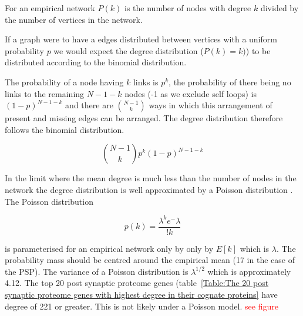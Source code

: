 For an empirical network $P(k)$ is the number of nodes with degree $k$ divided by the number of vertices in the network. 



If a graph were to have a  edges distributed between vertices with a uniform probability $p$ we would expect the degree distribution ($P(k)=k)$) to be distributed according to the binomial distribution.  

 The probability of a node having $k$ links is $p^k$, the probability of there being no links to the remaining $N-1-k$ nodes (-1 as we exclude self loops) is $(1-p)^{N-1-k}$ and there are $\binom{N-1}{k}$ ways in which this arrangement of present and missing edges can be arranged. The degree distribution therefore follows the binomial distribution.\cite{barabasi2016network}

\begin{equation}
   \binom{N-1}{k}        p^k (1-p)^{N-1-k}
   \label{Equation:BinomialDistributionForDegreeProbability}
\end{equation}

In the limit where the mean degree is much less than the number of nodes in the network the degree distribution is well approximated by a Poisson distribution \cite{barabasi2016network}. The Poisson distribution

\begin{equation}
    p(k) = \frac{\lambda^k e ^-\lambda}{!k}
\end{equation}

is parameterised for an empirical network only by only by $E[k]$ which is $\lambda$.  The probability mass should be centred around the empirical mean  (17 in the case of the PSP). The variance of a Poisson distribution is $\lambda^{1/2}$ which is approximately 4.12. The top 20 post synaptic proteome genes (table~\ref{Table:The 20 post synaptic proteome genes with highest degree in their cognate proteins} have degree of 221 or greater.  This is not likely under a Poisson model.   
 \textcolor{red}{see figure}


